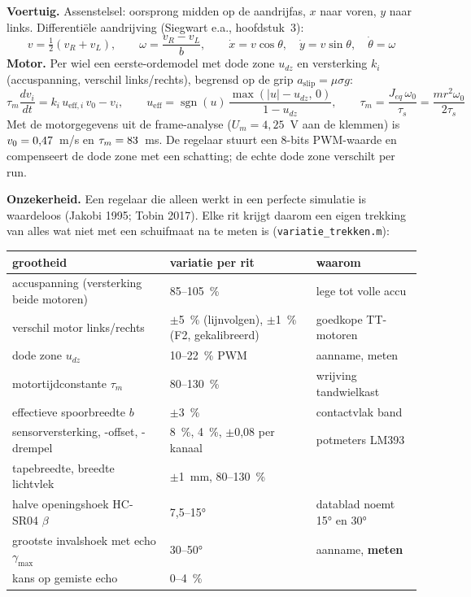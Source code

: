 \documentclass[10pt,a4paper]{article}
\begin{document}
\textbf{Voertuig.} Assenstelsel: oorsprong midden op de aandrijfas, $x$ naar voren, $y$ naar links.
Differentiële aandrijving (Siegwart e.a., hoofdstuk~3):
\begin{equation}
v = \tfrac12 (v_R + v_L), \qquad \omega = \frac{v_R - v_L}{b}, \qquad
\dot x = v\cos\theta,\quad \dot y = v\sin\theta,\quad \dot\theta = \omega
\label{eq:kin}
\end{equation}
\textbf{Motor.} Per wiel een eerste-ordemodel met dode zone $u_{dz}$ en versterking $k_i$
(accuspanning, verschil links/rechts), begrensd op de grip $a_{\text{slip}} = \mu\sigma g$:
\begin{equation}
\tau_m \frac{dv_i}{dt} = k_i\, u_{\text{eff},i}\, v_0 - v_i,\qquad
u_{\text{eff}} = \operatorname{sgn}(u)\,\frac{\max(|u| - u_{dz},\,0)}{1-u_{dz}},\qquad
\tau_m = \frac{J_{eq}\,\omega_0}{\tau_s} = \frac{m r^2 \omega_0}{2\tau_s}
\label{eq:motor}
\end{equation}
Met de motorgegevens uit de frame-analyse ($U_m = 4{,}25$~V aan de klemmen) is $v_0 = 0{,}47$~m/s
en $\tau_m = 83$~ms. De regelaar stuurt een 8-bits PWM-waarde en compenseert de dode zone
met een schatting; de echte dode zone verschilt per run.

\textbf{Onzekerheid.} Een regelaar die alleen werkt in een perfecte simulatie is waardeloos
(Jakobi 1995; Tobin 2017). Elke rit krijgt daarom een eigen trekking van alles wat niet met een
schuifmaat na te meten is (\texttt{variatie\_trekken.m}):

\begin{center}\footnotesize
\begin{tabular}{@{}lll@{}}
\toprule
grootheid & variatie per rit & waarom \\
\midrule
accuspanning (versterking beide motoren) & 85--105~\% & lege tot volle accu \\
verschil motor links/rechts & $\pm$5~\% (lijnvolgen), $\pm$1~\% (F2, gekalibreerd) & goedkope TT-motoren \\
dode zone $u_{dz}$ & 10--22~\% PWM & aanname, meten \\
motortijdconstante $\tau_m$ & 80--130~\% & wrijving tandwielkast \\
effectieve spoorbreedte $b$ & $\pm$3~\% & contactvlak band \\
sensorversterking, -offset, -drempel & 8~\%, 4~\%, $\pm$0{,}08 per kanaal & potmeters LM393 \\
tapebreedte, breedte lichtvlek & $\pm$1~mm, 80--130~\% & \\
halve openingshoek HC-SR04 $\beta$ & 7{,}5--15° & datablad noemt 15° en 30° \\
grootste invalshoek met echo $\gamma_{\max}$ & 30--50° & aanname, \textbf{meten} \\
kans op gemiste echo & 0--4~\% & \\
\bottomrule
\end{tabular}
\end{center}
\end{document}
